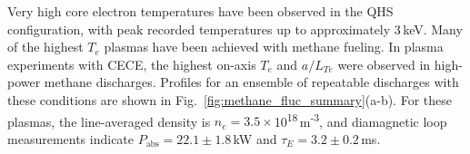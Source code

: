 \documentclass[%
 aip,
 amsmath,amssymb,
 reprint,%
]{revtex4-1}
\begin{document}
Very high core electron temperatures have been observed in the QHS configuration, with peak recorded temperatures up to approximately 3\,keV. Many of the highest $T_e$ plasmas have been achieved with methane fueling. In plasma experiments with CECE, the highest on-axis $T_e$ and $a/L_{Te}$ were observed in high-power methane discharges. Profiles for an ensemble of repeatable discharges with these conditions are shown in Fig.\ \ref{fig:methane_fluc_summary}(a-b). For these plasmas, the line-averaged density is $n_e=3.5\times$10\textsuperscript{18}\,m\textsuperscript{-3}, and diamagnetic loop measurements indicate $P_{\mathrm{abs}}=22.1\pm1.8$\,kW and $\tau_E=3.2\pm0.2$\,ms.
\end{document}
